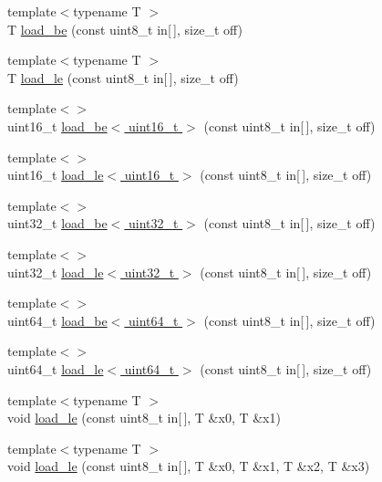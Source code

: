 \begin{DoxyCompactItemize}
{\footnotesize template$<$typename T $>$ }\\T \hyperlink{namespace_botan_a640029f085cc0a904b32e20f42303dd2}{load\+\_\+be} (const uint8\+\_\+t in\mbox{[}$\,$\mbox{]}, size\+\_\+t off)
\item 
{\footnotesize template$<$typename T $>$ }\\T \hyperlink{namespace_botan_a745efa1d08234fe3b785f17c19ec26b7}{load\+\_\+le} (const uint8\+\_\+t in\mbox{[}$\,$\mbox{]}, size\+\_\+t off)
\item 
{\footnotesize template$<$$>$ }\\uint16\+\_\+t \hyperlink{namespace_botan_ab6bab280ff3476b4539a9c2946c690f1}{load\+\_\+be$<$ uint16\+\_\+t $>$} (const uint8\+\_\+t in\mbox{[}$\,$\mbox{]}, size\+\_\+t off)
\item 
{\footnotesize template$<$$>$ }\\uint16\+\_\+t \hyperlink{namespace_botan_aeb5c38bea458b6183ef69afd5ec0cc42}{load\+\_\+le$<$ uint16\+\_\+t $>$} (const uint8\+\_\+t in\mbox{[}$\,$\mbox{]}, size\+\_\+t off)
\item 
{\footnotesize template$<$$>$ }\\uint32\+\_\+t \hyperlink{namespace_botan_a859a883d8cb8ec54d5c8d62969260bd8}{load\+\_\+be$<$ uint32\+\_\+t $>$} (const uint8\+\_\+t in\mbox{[}$\,$\mbox{]}, size\+\_\+t off)
\item 
{\footnotesize template$<$$>$ }\\uint32\+\_\+t \hyperlink{namespace_botan_a2d9442a9a8c4177d35388d0c82f7f2e0}{load\+\_\+le$<$ uint32\+\_\+t $>$} (const uint8\+\_\+t in\mbox{[}$\,$\mbox{]}, size\+\_\+t off)
\item 
{\footnotesize template$<$$>$ }\\uint64\+\_\+t \hyperlink{namespace_botan_a96d5556307d65f0974740f8c3fc33639}{load\+\_\+be$<$ uint64\+\_\+t $>$} (const uint8\+\_\+t in\mbox{[}$\,$\mbox{]}, size\+\_\+t off)
\item 
{\footnotesize template$<$$>$ }\\uint64\+\_\+t \hyperlink{namespace_botan_af8e343d945901fa17325279d27a14e39}{load\+\_\+le$<$ uint64\+\_\+t $>$} (const uint8\+\_\+t in\mbox{[}$\,$\mbox{]}, size\+\_\+t off)
\item 
{\footnotesize template$<$typename T $>$ }\\void \hyperlink{namespace_botan_abb60b6e5af3132bc5095cfcbaa90fc35}{load\+\_\+le} (const uint8\+\_\+t in\mbox{[}$\,$\mbox{]}, T \&x0, T \&x1)
\item 
{\footnotesize template$<$typename T $>$ }\\void \hyperlink{namespace_botan_a03b8aebd623614ee2d8804bb82b96928}{load\+\_\+le} (const uint8\+\_\+t in\mbox{[}$\,$\mbox{]}, T \&x0, T \&x1, T \&x2, T \&x3)

\end{DoxyCompactItemize}
